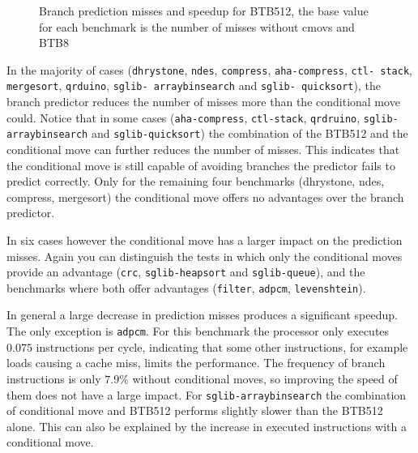 \documentclass[12pt,twoside,notitlepage]{report}
\begin{document}
\begin{figure}[htp]
\begin{subfigure}[b]{\textwidth}
\end{subfigure}
\caption{Branch prediction misses and speedup for BTB512, the base value for each benchmark is the number of misses without cmovs and BTB8}
\end{figure}


In the majority of cases (\texttt{dhrystone}, \texttt{ndes}, \texttt{compress}, \texttt{aha-compress}, \texttt{ctl- stack}, \texttt{mergesort}, \texttt{qrduino}, \texttt{sglib- arraybinsearch} and \texttt{sglib- quicksort}), the branch predictor reduces the number of misses more than the conditional move could. Notice that in some cases (\texttt{aha-compress}, \texttt{ctl-stack}, \texttt{qrdruino}, \texttt{sglib-arraybinsearch} and \texttt{sglib-quicksort}) the combination of the BTB512 and the conditional move can further reduces the number of misses. This indicates that the conditional move is still capable of avoiding branches the predictor fails to predict correctly. Only for the remaining four benchmarks (dhrystone, ndes, compress, mergesort) the conditional move offers no advantages over the branch predictor.

In six cases however the conditional move has a larger impact on the prediction misses. Again you can distinguish the tests in which only the conditional moves provide an advantage (\texttt{crc}, \texttt{sglib-heapsort} and \texttt{sglib-queue}), and the benchmarks where both offer advantages (\texttt{filter}, \texttt{adpcm}, \texttt{levenshtein}).

In general a large decrease in prediction misses produces a significant speedup. The only exception is \texttt{adpcm}. For this benchmark the processor only executes $0.075$ instructions per cycle, indicating that some other instructions, for example loads causing a cache miss, limits the performance. The frequency of branch instructions is only $7.9\%$ without conditional moves, so improving the speed of them does not have a large impact. 
For \texttt{sglib-arraybinsearch} the combination of conditional move and BTB512 performs slightly slower than the BTB512 alone. This can also be explained by the increase in executed instructions with a conditional move.
\end{document}
